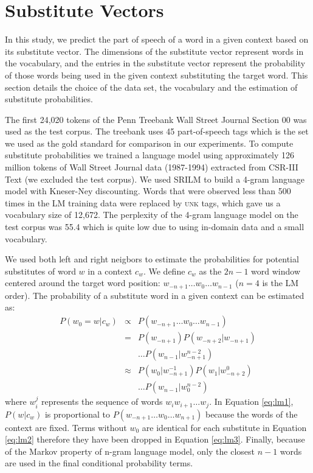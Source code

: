 \documentclass[11pt]{article}
\begin{document}
\section{Substitute Vectors}
\label{sec:lm}

In this study, we predict the part of speech of a word in a given
context based on its substitute vector.  The dimensions of the
substitute vector represent words in the vocabulary, and the entries
in the substitute vector represent the probability of those words
being used in the given context substituting the target word.  This
section details the choice of the data set, the vocabulary and the
estimation of substitute probabilities.

The first 24,020 tokens of the Penn Treebank \cite{treebank3} Wall
Street Journal Section 00 was used as the test corpus.
The treebank uses 45 part-of-speech tags which is the set we used as
the gold standard for comparison in our experiments.
To compute substitute probabilities we trained a language model using
approximately 126 million tokens of Wall Street Journal data
(1987-1994) extracted from CSR-III Text \cite{csr3text} (we excluded
the test corpus).
We used SRILM \cite{Stolcke2002} to build a 4-gram language model with
Kneser-Ney discounting.
Words that were observed less than 500 times in the LM training data
were replaced by \textsc{unk} tags, which gave us a vocabulary size of
12,672.  
The perplexity of the 4-gram language model on the test corpus was
55.4 which is quite low due to using in-domain data and a small
vocabulary.

We used both left and right neigbors to estimate the probabilities for
potential substitutes of word $w$ in a context $c_w$.  We define $c_w$
as the $2n-1$ word window centered around the target word position:
$w_{-n+1} \ldots w_0 \ldots w_{n-1}$ ($n=4$ is the LM order).  The
probability of a substitute word in a given context can be estimated
as:
\begin{eqnarray}
  \label{eq:lm1}P(w_0 = w | c_w) & \propto & P(w_{-n+1}\ldots w_0\ldots w_{n-1})\\
  \label{eq:lm2}& = & P(w_{-n+1})P(w_{-n+2}|w_{-n+1})\nonumber\\
  &&\ldots P(w_{n-1}|w_{-n+1}^{n-2})\\
  \label{eq:lm3}& \approx & P(w_0| w_{-n+1}^{-1})P(w_{1}|w_{-n+2}^0)\nonumber\\
  &&\ldots P(w_{n-1}|w_0^{n-2})
\end{eqnarray}
where $w_i^j$ represents the sequence of words $w_i w_{i+1} \ldots
w_{j}$.  In Equation \ref{eq:lm1}, $P(w|c_w)$ is proportional to
$P(w_{-n+1}\ldots w_0 \ldots w_{n+1})$ because the words of the
context are fixed.  Terms without $w_0$ are identical for each
substitute in Equation \ref{eq:lm2} therefore they have been dropped
in Equation \ref{eq:lm3}.  Finally, because of the Markov property of
n-gram language model, only the closest $n-1$ words are used in the
final conditional probability terms.
\end{document}
